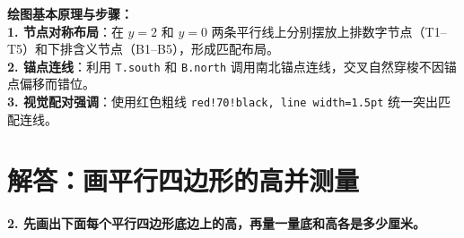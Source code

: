 \vspace{0.6cm}

{\small\color{blue!70!black}
\textbf{绘图基本原理与步骤：}\\
\textbf{1. 节点对称布局}：在 $y=2$ 和 $y=0$ 两条平行线上分别摆放上排数字节点（T1--T5）和下排含义节点（B1--B5），形成匹配布局。\\
\textbf{2. 锚点连线}：利用 \texttt{T.south} 和 \texttt{B.north} 调用南北锚点连线，交叉自然穿梭不因锚点偏移而错位。\\
\textbf{3. 视觉配对强调}：使用红色粗线 \texttt{red!70!black, line width=1.5pt} 统一突出匹配连线。
}

\newpage



\section{解答：画平行四边形的高并测量}

\vspace{0.4cm}

\noindent\textbf{2. 先画出下面每个平行四边形底边上的高，再量一量底和高各是多少厘米。}

\vspace{0.8cm}

